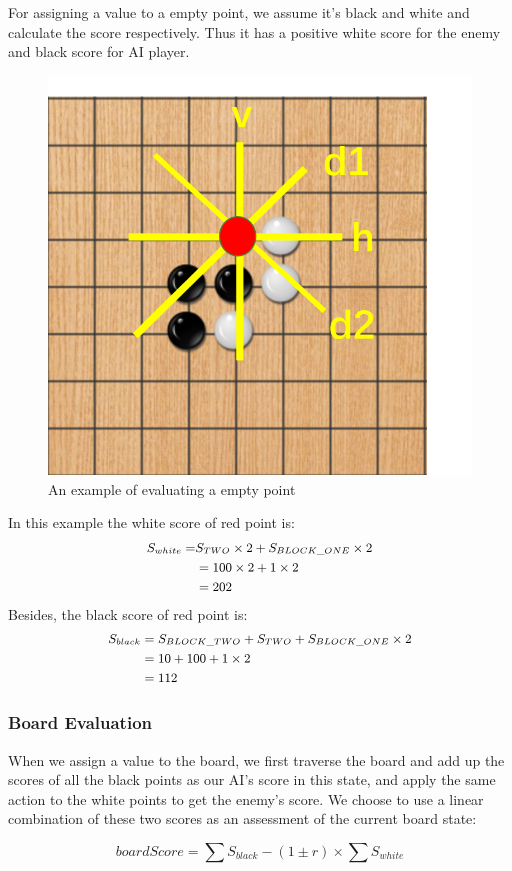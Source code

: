\documentclass[a4paper, 12pt]{article} %
\begin{document}
\begin{multicols}{2}
    For assigning a value to a empty point, we assume it's black and white and calculate the score respectively. Thus it has a positive white score for the enemy and black score for AI player.
    \begin{figure}[H]
    \centering
    \includegraphics[scale=0.4]{example.png}
    \caption{An example of evaluating a empty point }
    \label{figure}
    \end{figure}
    In this example the white score of red point is:
    $$
    \begin{small}
    \begin{aligned}
    S_{white} =& S_{TWO}\times 2+S_{BLOCK\_ONE}\times 2\\ &= 100\times 2+1\times 2\\ &= 202
    \end{aligned}
    \end{small}
    $$
    Besides, the black score of red point is:
    $$
    \begin{small}
    \begin{aligned}
    S_{black} &= S_{BLOCK\_TWO}+S_{TWO}+S_{BLOCK\_ONE}\times 2\\ &= 10+100+1\times 2\\ &= 112
    \end{aligned}
    \end{small}
    $$
    \subsubsection{Board Evaluation}
    When we assign a value to the board, we first traverse the board and add up the scores of all the black points as our AI's score in this state, and apply the same action to the white points to get the enemy's score. We choose to use a linear combination of these two scores as an assessment of the current board state: 
    \begin{scriptsize}
    $$
    boardScore = \sum S_{black}-(1\pm r)\times \sum S_{white}
    $$
    \end{scriptsize}
    

\end{multicols}
\end{document}
